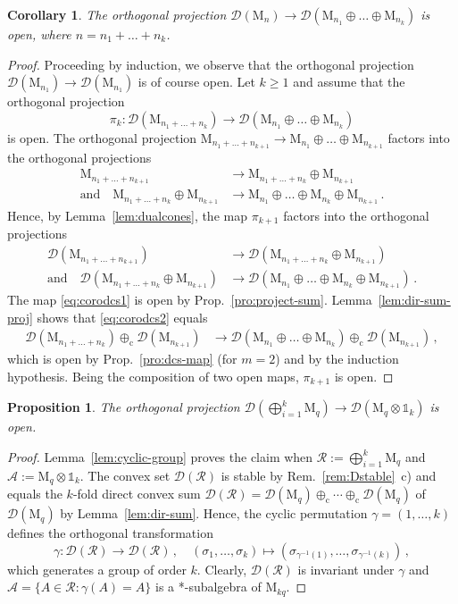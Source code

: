 \documentclass[a4paper,11pt,reqno]{amsart}
\newcommand{\M}{\mathrm{M}}
\newcommand{\cA}{\mathcal{A}}
\newcommand{\cD}{\mathcal{D}}
\newcommand{\cR}{\mathcal{R}}
\newcommand{\id}{\mathds{1}}
\newcommand{\dcs}{\oplus_\mathrm{c}}
\newtheorem{cor}[thm]{Corollary}
\newtheorem{prop}[thm]{Proposition}
\theoremstyle{definition}
\theoremstyle{remark}
\numberwithin{equation}{section}
\begin{document}
%
\begin{cor}\label{cor:project-sum}
The orthogonal projection 
$\cD(\M_n)\to\cD(\M_{n_1}\oplus\dots\oplus\M_{n_k})$ is open,
where $n=n_1+\dots+n_k$.
\end{cor}
%
\begin{proof}
Proceeding by induction, we observe that the orthogonal projection 
$\cD(\M_{n_1})\to\cD(\M_{n_1})$ is of course open. Let $k\geq 1$ and 
assume that the orthogonal projection
\[\textstyle
\pi_k:\cD(\M_{n_1+\dots+n_k})\to\cD(\M_{n_1}\oplus\dots\oplus\M_{n_k})
\]
is open. The orthogonal projection 
$\M_{n_1+\dots+n_{k+1}}\to\M_{n_1}\oplus\dots\oplus\M_{n_{k+1}}$ factors 
into the orthogonal projections
\begin{align*}
\M_{n_1+\dots+n_{k+1}}
&\to\M_{n_1+\dots+n_k}\oplus\M_{n_{k+1}}\\
\text{and}\quad
\M_{n_1+\dots+n_k}\oplus\M_{n_{k+1}}
&\to\M_{n_1}\oplus\dots\oplus\M_{n_k}\oplus\M_{n_{k+1}}\,.
\end{align*}
Hence, by Lemma~\ref{lem:dualcones}, the map $\pi_{k+1}$ factors into
the orthogonal projections
\begin{align}
\label{eq:corodcs1}
\cD(\M_{n_1+\dots+n_{k+1}})
&\to\cD(\M_{n_1+\dots+n_k}\oplus\M_{n_{k+1}})\\
\label{eq:corodcs2}
\text{and}\quad
\cD(\M_{n_1+\dots+n_k}\oplus\M_{n_{k+1}})
&\to\cD(\M_{n_1}\oplus\dots\oplus\M_{n_k}\oplus\M_{n_{k+1}})\,.
\end{align}
The map \eqref{eq:corodcs1} is open by Prop.~\ref{pro:project-sum}.
Lemma~\ref{lem:dir-sum-proj} shows that \eqref{eq:corodcs2} equals
\begin{align*}
\cD(\M_{n_1+\dots+n_k})\dcs\cD(\M_{n_{k+1}})
&\to\cD(\M_{n_1}\oplus\dots\oplus\M_{n_k})\dcs\cD(\M_{n_{k+1}})\,,
\end{align*}
which is open by Prop.~\ref{pro:dcs-map} (for $m=2$) and by the 
induction hypothesis. Being the composition of two open maps, 
$\pi_{k+1}$ is open.
\end{proof}
%
\begin{prop}\label{pro:project-tensor}
The orthogonal projection 
$\cD(\bigoplus_{i=1}^k\M_q)\to\cD(\M_q\otimes\id_k)$ is open.
\end{prop}
%
\begin{proof}
Lemma~\ref{lem:cyclic-group} proves the claim when $\cR:=\bigoplus_{i=1}^k\M_q$ 
and $\cA:=\M_q\otimes\id_k$. The convex set $\cD(\cR)$ is stable by 
Rem.~\ref{rem:Dstable}~c) and equals the $k$-fold direct convex sum
$\cD(\cR)=\cD(\M_q)\dcs\cdots\dcs\cD(\M_q)$ of $\cD(\M_q)$ by 
Lemma~\ref{lem:dir-sum}. Hence, the cyclic permutation $\gamma=(1,\dots,k)$ 
defines the orthogonal transformation
\[\textstyle
\gamma:\cD(\cR)\to\cD(\cR)\,,
\quad
(\sigma_1,\dots,\sigma_k)
\mapsto(\sigma_{\gamma^{-1}(1)},\dots,\sigma_{\gamma^{-1}(k)})\,,
\]
which generates a group of order $k$. Clearly, $\cD(\cR)$ is invariant under 
$\gamma$ and $\cA=\{A\in\cR:\gamma(A)=A\}$ is a *-subalgebra of $\M_{kq}$.
\end{proof}
\end{document}
